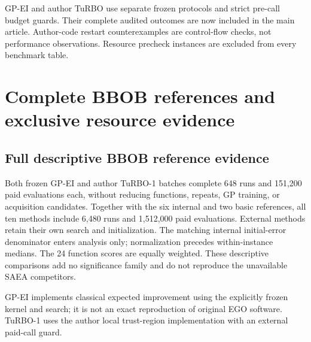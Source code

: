 \documentclass[suppldata]{interact}
\begin{document}
\endgroup

GP-EI and author TuRBO use separate frozen protocols and strict pre-call budget guards. Their complete audited outcomes are now included in the main article. Author-code restart counterexamples are control-flow checks, not performance observations. Resource precheck instances are excluded from every benchmark table.

\hypertarget{complete-bbob-references-and-exclusive-resource-evidence}{%
\section{Complete BBOB references and exclusive resource evidence}\label{complete-bbob-references-and-exclusive-resource-evidence}}

\hypertarget{full-descriptive-bbob-reference-evidence}{%
\subsection{Full descriptive BBOB reference evidence}\label{full-descriptive-bbob-reference-evidence}}

Both frozen GP-EI and author TuRBO-1 batches complete 648 runs and 151,200 paid evaluations each, without reducing functions, repeats, GP training, or acquisition candidates. Together with the six internal and two basic references, all ten methods include 6,480 runs and 1,512,000 paid evaluations. External methods retain their own search and initialization. The matching internal initial-error denominator enters analysis only; normalization precedes within-instance medians. The 24 function scores are equally weighted. These descriptive comparisons add no significance family and do not reproduce the unavailable SAEA competitors.

GP-EI implements classical expected improvement \citep{ref03} using the explicitly frozen kernel and search; it is not an exact reproduction of original EGO software. TuRBO-1 uses the author local trust-region implementation \citep{ref25} with an external paid-call guard.

\FloatBarrier\begingroup\fontsize{8.5}{10.5}\selectfont\setlength\tabcolsep{3pt}
\end{document}
